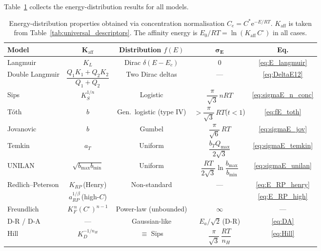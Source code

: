 \documentclass[12pt]{article}
\begin{document}
	Table~\ref{tab:energy_summary} collects the energy-distribution
	results for all models.

	\begin{table}[htbp]
		\centering
		\small
		\caption{Energy-distribution properties obtained via
			concentration normalisation
			$C_e = C^{\ast}\mathrm{e}^{-E/RT}$.
			$K_{\mathrm{aff}}$ is taken from
			Table~\ref{tab:universal_descriptors}.  The affinity
			energy is
			$E_0/RT = \ln(K_{\mathrm{aff}}\,C^\circ)$ in all cases.}
		\label{tab:energy_summary}
		\renewcommand{\arraystretch}{1.35}
		\begin{tabular}{lcccc}
			\hline
			\textbf{Model}
			& $\boldsymbol{K_{\mathrm{aff}}}$
			& \textbf{Distribution $f(E)$}
			& $\boldsymbol{\sigma_E}$
			& \textbf{Eq.}
			\\
			\hline
			Langmuir
			& $K_L$
			& Dirac $\delta(E - E_c)$
			& $0$
			& \eqref{eq:E_langmuir}
			\\
			Double Langmuir
			& $\dfrac{Q_1 K_1 + Q_2 K_2}{Q_1 + Q_2}$
			& Two Dirac deltas
			& ---
			& \eqref{eq:DeltaE12}
			\\
			Sips
			& $K_S^{1/n}$
			& Logistic
			& $\dfrac{\pi}{\sqrt{3}}\,nRT$
			& \eqref{eq:sigmaE_n_conc}
			\\
			T\'oth
			& $b$
			& Gen.\ logistic (type IV)
			& $> \dfrac{\pi}{\sqrt{3}}\,RT$\;($t<1$)
			& \eqref{eq:fE_toth}
			\\
			Jovanovic
			& $b$
			& Gumbel
			& $\dfrac{\pi}{\sqrt{6}}\,RT$
			& \eqref{eq:sigmaE_jov}
			\\
			Temkin
			& $a_T$
			& Uniform
			& $\dfrac{b_T Q_{\max}}{2\sqrt{3}}$
			& \eqref{eq:sigmaE_temkin}
			\\
			UNILAN
			& $\sqrt{b_{\max}b_{\min}}$
			& Uniform
			& $\dfrac{RT}{2\sqrt{3}}
			\ln\!\dfrac{b_{\max}}{b_{\min}}$
			& \eqref{eq:sigmaE_unilan}
			\\
			Redlich--Peterson
			& $K_{RP}$\,(Henry)
			& Non-standard
			& ---
			& \eqref{eq:E_RP_henry}
			\\
			& $a_{RP}^{1/\beta}$\,(high-$C$)
			&
			&
			& \eqref{eq:E_RP_high}
			\\
			Freundlich
			& $K_F^{\,n}(C^\circ)^{n-1}$
			& Power-law (unbounded)
			& $\infty$
			& ---
			\\
			D-R / D-A
			& ---
			& Gaussian-like
			& $E_a / \sqrt{2}$\,(D-R)
			& \eqref{eq:DA}
			\\
			Hill
			& $K_D^{-1/n_H}$
			& $\equiv$ Sips
			& $\dfrac{\pi}{\sqrt{3}}\,\dfrac{RT}{n_H}$
			& \eqref{eq:Hill}
			\\
			\hline
		\end{tabular}
	\end{table}
\end{document}

